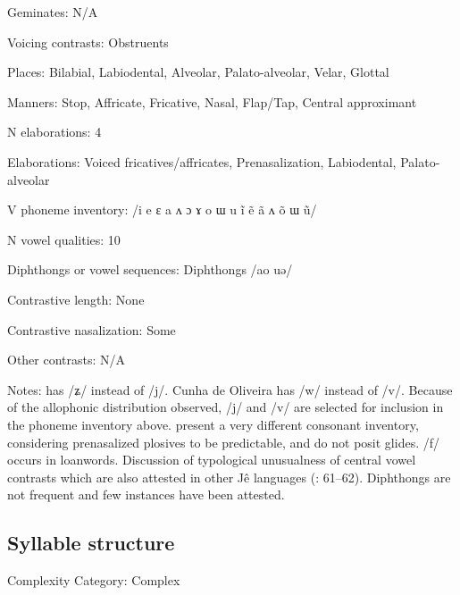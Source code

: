 {\begin{appendixdesc}
\item[Geminates:] N/A

\item[Voicing contrasts:] Obstruents

\item[Places:] Bilabial, Labiodental, Alveolar, Palato-alveolar, Velar, Glottal

\item[Manners:] Stop, Affricate, Fricative, Nasal, Flap/Tap, Central approximant

\item[N elaborations:] 4

\item[Elaborations:] Voiced fricatives/affricates, Prenasalization, Labiodental, Palato-alveolar

\item[V phoneme inventory:] /i e ɛ a ʌ ɔ ɤ o ɯ u ĩ ẽ ã ʌ õ ɯ ũ/

\item[N vowel qualities:] 10

\item[Diphthongs or vowel sequences:] Diphthongs /ao uə/

\item[Contrastive length:] None

\item[Contrastive nasalization:] Some

\item[Other contrasts:] N/A

\item[Notes:] \citet{Ham2009} has /ʑ/ instead of /j/. Cunha de Oliveira has /w/ instead of /v/. Because of the allophonic distribution observed, /j/ and /v/ are selected for inclusion in the phoneme inventory above. \citet{BurgessHam1968} present a very different consonant inventory, considering prenasalized plosives to be predictable, and do not posit glides. /f/ occurs in loanwords. Discussion of typological unusualness of central vowel contrasts which are also attested in other Jê languages (\citealt{CunhadeOliveira2005}: 61--62). Diphthongs are not frequent and few instances have been attested.
\end{appendixdesc}
\subsection*{Syllable structure}
\begin{appendixdesc}

\item[Complexity Category:] Complex


\end{appendixdesc}}
